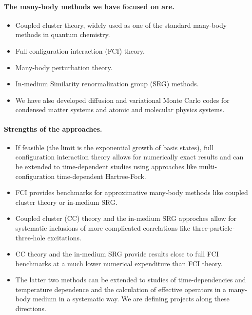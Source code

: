 \documentclass[%
oneside,                 %
final,                   %
10pt]{article}
\begin{document}
\paragraph{The many-body methods we have focused on are.}
\begin{itemize}
\item Coupled cluster theory, widely used as one of the standard many-body methods in quantum chemistry.

\item Full configuration interaction (FCI) theory.

\item Many-body perturbation theory.

\item In-medium Similarity renormalization group (SRG) methods.

\item We have also developed diffusion and variational Monte Carlo codes for condensed matter systems and atomic and molecular physics systems.
\end{itemize}

\noindent
\paragraph{Strengths of the approaches.}
\begin{itemize}
\item If feasible (the limit is the exponential growth of basis states), full configuration interaction theory allows for numerically exact results and can be extended to time-dependent studies using approaches like multi-configuration time-dependent Hartree-Fock.

\item FCI provides benchmarks for approximative many-body methods like coupled cluster theory or in-medium SRG.

\item Coupled cluster (CC) theory and the in-medium SRG approches allow for systematic inclusions of more complicated correlations like three-particle-three-hole excitations.

\item CC theory and the in-medium SRG provide results close to full FCI benchmarks at a much lower numerical expenditure than FCI theory. 

\item The latter two methods can be extended to studies of time-dependencies and temperature dependence and the calculation of effective operators in a many-body medium in a systematic way. We are defining projects along these directions. 
\end{itemize}
\end{document}
